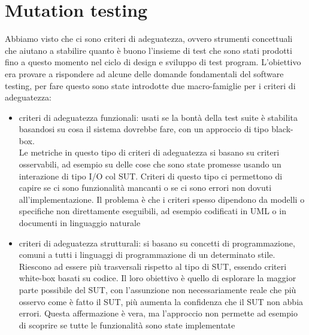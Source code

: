 \documentclass{article}
\begin{document}
\section{Mutation testing}
Abbiamo visto che ci sono criteri di adeguatezza, ovvero strumenti concettuali che aiutano a stabilire quanto è buono l'insieme di test che sono stati prodotti fino a questo momento nel ciclo di design e sviluppo di test program. L'obiettivo era provare a rispondere ad alcune delle domande fondamentali del software testing, per fare questo sono state introdotte due macro-famiglie per i criteri di adeguatezza:
\begin{itemize}
\item criteri di adeguatezza funzionali: usati se la bontà della test suite è stabilita basandosi su cosa il sistema dovrebbe fare, con un approccio di tipo black-box.\\ Le metriche in questo tipo di criteri di adeguatezza si basano su criteri osservabili, ad esempio su delle cose che sono state promesse usando un interazione di tipo I/O col SUT. Criteri di questo tipo ci permettono di capire se ci sono funzionalità mancanti o se ci sono errori non dovuti all'implementazione. Il problema è che i criteri spesso dipendono da modelli o specifiche non direttamente eseguibili, ad esempio codificati in UML o in documenti in linguaggio naturale
\item criteri di adeguatezza strutturali: si basano su concetti di programmazione, comuni a tutti i linguaggi di programmazione di un determinato stile. Riescono ad essere più trasversali rispetto al tipo di SUT, essendo criteri white-box basati su codice. Il loro obiettivo è quello di esplorare la maggior parte possibile del SUT, con l'assunzione non necessariamente reale che più osservo come è fatto il SUT, più aumenta la confidenza che il SUT non abbia errori. Questa affermazione è vera, ma l'approccio non permette ad esempio di scoprire se tutte le funzionalità sono state implementate
\end{itemize}
\end{document}
